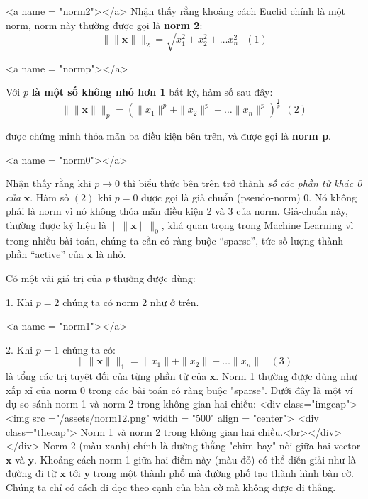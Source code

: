<a name = "norm2"></a> 
Nhận thấy rằng khoảng cách Euclid chính là một norm, norm này thường được gọi là \textbf{norm 2}: 
\begin{equation*} 
\|\|\mathbf{x}\|\|_2 = \sqrt{x_1^2 + x_2^2 + \dots x_n^2} ~~~ (1) 
\end{equation*} 
 
<a name = "normp"></a> 
 
Với $p$ \textbf{là một số không nhỏ hơn 1} bất kỳ, hàm số sau đây: 
\begin{equation*} 
\|\|\mathbf{x}\|\|_p = (\|x_1\|^p + \|x_2\|^p + \dots \|x_n\|^p)^{\frac{1}{p}} ~~(2) 
\end{equation*} 
 
được chứng minh thỏa mãn ba điều kiện bên trên, và được gọi là \textbf{norm p}.  
 
<a name = "norm0"></a> 
 
Nhận thấy rằng khi $p \rightarrow 0 $ thì biểu thức bên trên trở thành \textit{số các phần tử khác 0 của} $\mathbf{x}$. Hàm số  $(2)$ khi $p = 0$ được gọi là giả chuẩn (pseudo-norm) 0. Nó không phải là norm vì nó không thỏa mãn điều kiện 2 và 3 của norm. Giả-chuẩn này, thường được ký hiệu là $\|\|\mathbf{x}\|\|_0$, khá quan trọng trong Machine Learning vì trong nhiều bài toán, chúng ta cần có ràng buộc “sparse”, tức số lượng thành phần “active” của $\mathbf{x}$ là nhỏ.  
 
Có một vài giá trị của $p$ thường được dùng: 
 
1. Khi $p = 2$ chúng ta có norm 2 như ở trên. 
 
<a name = "norm1"></a> 
 
2. Khi $p = 1$ chúng ta có: 
\begin{equation*} 
\|\|\mathbf{x}\|\|_1 = \|x_1\| + \|x_2\| + \dots \|x_n\| ~~~~ (3) 
\end{equation*} 
là tổng các trị tuyệt đối của từng phần tử của $\mathbf{x}$. Norm 1 thường được dùng như xấp xỉ của norm 0 trong các bài toán có ràng buộc "sparse". Dưới đây là một ví dụ so sánh norm 1 và norm 2 trong không gian hai chiều: 
<div class="imgcap"> 
<img src ="/assets/norm12.png" width = "500" align = "center"> 
<div class="thecap"> Norm 1 và norm 2 trong không gian hai chiều.<br></div> 
</div>  
Norm 2 (màu xanh) chính là đường thằng "chim bay" nối giữa hai vector $\mathbf{x} $ và $\mathbf{y}$. Khoảng cách norm 1 giữa hai điểm này (màu đỏ) có thể diễn giải như là đường đi từ $\mathbf{x} $ tới $\mathbf{y}$ trong một thành phố mà đường phố tạo thành hình bàn cờ. Chúng ta chỉ có cách đi dọc theo cạnh của bàn cờ mà không được đi thẳng. 
 
